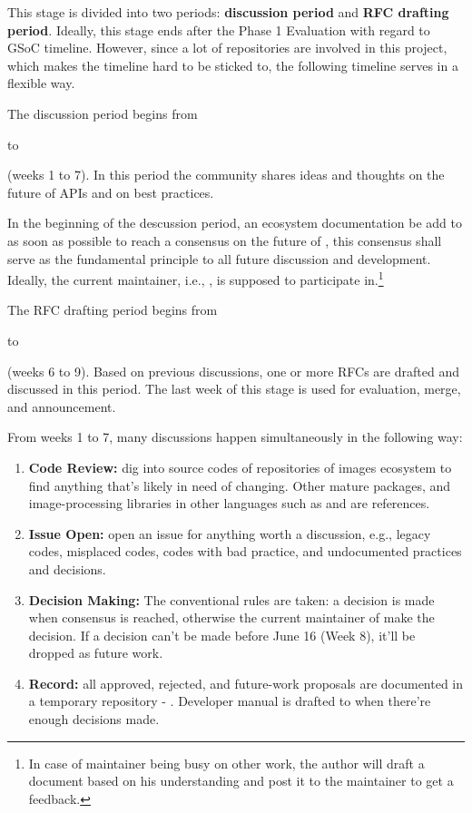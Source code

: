 This stage is divided into two periods: \textbf{discussion period} and \textbf{RFC drafting period}. Ideally, this stage ends after the \textsf{Phase 1 Evaluation} with regard to GSoC timeline. However, since a lot of repositories are involved in this project, which makes the timeline hard to be sticked to, the following timeline serves in a flexible way.\par

The discussion period begins from \date{April 22} to \date{June 9} (weeks 1 to 7). In this period the community shares ideas and thoughts on the future of APIs and on best practices.\par

In the beginning of the descussion period, an ecosystem documentation be add to \repoimagesgithubio{} as soon as possible to reach a consensus on the future of \images{}, this consensus shall serve as the fundamental principle to all future discussion and development. Ideally, the current \images{} maintainer, i.e., \timholy, is supposed to participate in.\footnote{In case of maintainer being busy on other work, the author will draft a document based on his understanding and post it to the maintainer to get a feedback.}\par

The RFC drafting period begins from \date{May 27} to \date{June 23} (weeks 6 to 9). Based on previous discussions, one or more RFCs are drafted and discussed in this period. The last week of this stage is used for evaluation, merge, and announcement.\par

From weeks 1 to 7, many discussions happen simultaneously in the following way:
\begin{enumerate}
    \item \textbf{Code Review:} dig into source codes of repositories of images ecosystem to find anything that's likely in need of changing. Other mature \langjulia{} packages, and image-processing libraries in other languages such as \reposcikitimage{} and \matlabimageprocessing{} are references.
    \item \textbf{Issue Open:} open an issue for anything worth a discussion, e.g., legacy codes, misplaced codes, codes with bad practice, and undocumented practices and decisions.
    \item \textbf{Decision Making:} The conventional rules are taken: a decision is made when consensus is reached, otherwise the current maintainer of \images{} make the decision. If a decision can't be made before June 16 (Week 8), it'll be dropped as future work.
    \item \textbf{Record:} all approved, rejected, and future-work proposals are documented in a temporary repository - \repogsoctempdoc{}. Developer manual is drafted to \repoimagesgithubio{} when there're enough decisions made.
\end{enumerate}

